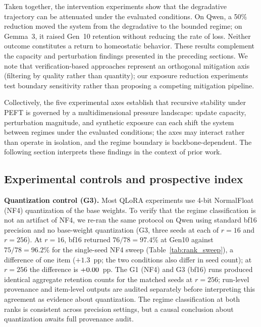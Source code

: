 \documentclass[a4paper,fleqn]{cas-dc}
\newif\ifshowchanges
\newcommand{\rev}[1]{\ifshowchanges{\color{blue}#1}\else{#1}\fi}
\begin{document}
Taken together, the intervention experiments show that the 
\rev{degradative trajectory can be attenuated under the evaluated 
conditions. On Qwen, a 50\% reduction moved the system from the degradative to the bounded regime; on Gemma~3, it raised Gen~10 retention without reducing the rate of loss. Neither outcome constitutes a return to homeostatic behavior.} These results complement the capacity and perturbation findings presented in the preceding sections. We note
that verification-based approaches \citep{yi2025} represent an orthogonal
mitigation axis (filtering by quality rather than quantity); our exposure
reduction experiments test boundary sensitivity rather than proposing a
competing mitigation pipeline.

Collectively, the five experimental axes establish that recursive stability
under PEFT is governed by a multidimensional pressure landscape: update
capacity, perturbation magnitude, and synthetic exposure \rev{can each shift} the system between regimes under the evaluated conditions; the axes may interact rather than operate in isolation, and the regime boundary is backbone-dependent. The following section
interprets these findings in the context of prior work.

\FloatBarrier
\subsection{Experimental controls and prospective index}\label{sec:res_controls}

\rev{\textbf{Quantization control (G3).}
Most QLoRA experiments use 4-bit NormalFloat (NF4) quantization of the base
weights. To verify that the regime classification is not an artifact of NF4, we
re-ran the same protocol on Qwen using standard bf16 precision and no base-weight
quantization (G3, three seeds at each of $r=16$ and $r=256$). At $r=16$, bf16 returned $76/78 = 97.4\%$ at Gen10 against $75/78 = 96.2\%$ for
the single-seed NF4 sweep (Table~\ref{tab:rank_sweep}), a difference of one item ($+1.3$~pp; the two conditions also differ in seed count); at $r=256$ the difference is $+0.00$~pp.
The G1 (NF4) and G3 (bf16) runs produced identical aggregate retention counts
for the matched seeds at $r=256$; run-level provenance and item-level outputs
are audited separately before interpreting this agreement as evidence about
quantization. The regime classification at both ranks is consistent across
precision settings, but a causal conclusion about quantization awaits full
provenance audit.}
\end{document}

